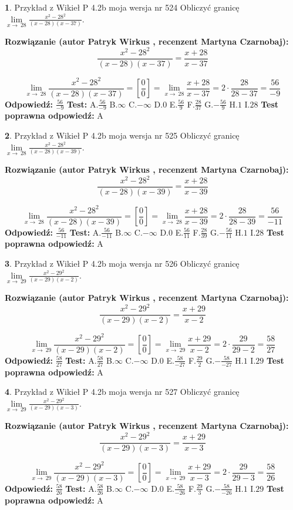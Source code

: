 \documentclass[12pt, a4paper]{article}
\theoremstyle{definition} %
\newtheorem{zad}{}
\newcommand{\zadStart}[1]{\begin{zad}#1\newline}
\newcommand{\zadStop}{\end{zad}}
\newcommand{\rozwStart}[2]{\noindent \textbf{Rozwiązanie (autor #1 , recenzent #2): }\newline}
\newcommand{\rozwStop}{\newline}
\newcommand{\odpStart}{\noindent \textbf{Odpowiedź:}\newline}
\newcommand{\odpStop}{\newline}
\newcommand{\testStart}{\noindent \textbf{Test:}\newline}
\newcommand{\testStop}{\newline}
\newcommand{\kluczStart}{\noindent \textbf{Test poprawna odpowiedź:}\newline}
\newcommand{\kluczStop}{\newline}
\begin{document}
\zadStart{Przykład z Wikieł P 4.2b moja wersja nr 524}
Obliczyć granicę $\lim\limits_{x\to\ 28}\frac{x^{2}-28^{2}}{(x-28)(x-37)}$.
\zadStop
\rozwStart{Patryk Wirkus}{Martyna Czarnobaj}
$$\frac{x^{2}-28^{2}}{(x-28)(x-37)}=\frac{x+28}{x-37}$$

$$\lim\limits_{x\to\ 28}\frac{x^{2}-28^{2}}{(x-28)(x-37)}=[\frac{0}{0}]=\lim\limits_{x\to\ 28}\frac{x+28}{x-37}=2 \cdot \frac{28}{28-37} = \frac{56}{-9}$$
\rozwStop
\odpStart
$\frac{56}{-9}$
\odpStop
\testStart
A.$\frac{56}{-9}$
B.$\infty$
C.$-\infty$
D.$0$
E.$\frac{56}{9}$
F.$\frac{28}{37}$
G.$-\frac{56}{9}$
H.$1$
I.$28$
\testStop
\kluczStart
A
\kluczStop



\zadStart{Przykład z Wikieł P 4.2b moja wersja nr 525}
Obliczyć granicę $\lim\limits_{x\to\ 28}\frac{x^{2}-28^{2}}{(x-28)(x-39)}$.
\zadStop
\rozwStart{Patryk Wirkus}{Martyna Czarnobaj}
$$\frac{x^{2}-28^{2}}{(x-28)(x-39)}=\frac{x+28}{x-39}$$

$$\lim\limits_{x\to\ 28}\frac{x^{2}-28^{2}}{(x-28)(x-39)}=[\frac{0}{0}]=\lim\limits_{x\to\ 28}\frac{x+28}{x-39}=2 \cdot \frac{28}{28-39} = \frac{56}{-11}$$
\rozwStop
\odpStart
$\frac{56}{-11}$
\odpStop
\testStart
A.$\frac{56}{-11}$
B.$\infty$
C.$-\infty$
D.$0$
E.$\frac{56}{11}$
F.$\frac{28}{39}$
G.$-\frac{56}{11}$
H.$1$
I.$28$
\testStop
\kluczStart
A
\kluczStop



\zadStart{Przykład z Wikieł P 4.2b moja wersja nr 526}
Obliczyć granicę $\lim\limits_{x\to\ 29}\frac{x^{2}-29^{2}}{(x-29)(x-2)}$.
\zadStop
\rozwStart{Patryk Wirkus}{Martyna Czarnobaj}
$$\frac{x^{2}-29^{2}}{(x-29)(x-2)}=\frac{x+29}{x-2}$$

$$\lim\limits_{x\to\ 29}\frac{x^{2}-29^{2}}{(x-29)(x-2)}=[\frac{0}{0}]=\lim\limits_{x\to\ 29}\frac{x+29}{x-2}=2 \cdot \frac{29}{29-2} = \frac{58}{27}$$
\rozwStop
\odpStart
$\frac{58}{27}$
\odpStop
\testStart
A.$\frac{58}{27}$
B.$\infty$
C.$-\infty$
D.$0$
E.$\frac{58}{-27}$
F.$\frac{29}{2}$
G.$-\frac{58}{-27}$
H.$1$
I.$29$
\testStop
\kluczStart
A
\kluczStop



\zadStart{Przykład z Wikieł P 4.2b moja wersja nr 527}
Obliczyć granicę $\lim\limits_{x\to\ 29}\frac{x^{2}-29^{2}}{(x-29)(x-3)}$.
\zadStop
\rozwStart{Patryk Wirkus}{Martyna Czarnobaj}
$$\frac{x^{2}-29^{2}}{(x-29)(x-3)}=\frac{x+29}{x-3}$$

$$\lim\limits_{x\to\ 29}\frac{x^{2}-29^{2}}{(x-29)(x-3)}=[\frac{0}{0}]=\lim\limits_{x\to\ 29}\frac{x+29}{x-3}=2 \cdot \frac{29}{29-3} = \frac{58}{26}$$
\rozwStop
\odpStart
$\frac{58}{26}$
\odpStop
\testStart
A.$\frac{58}{26}$
B.$\infty$
C.$-\infty$
D.$0$
E.$\frac{58}{-26}$
F.$\frac{29}{3}$
G.$-\frac{58}{-26}$
H.$1$
I.$29$
\testStop
\kluczStart
A
\kluczStop
\end{document}
